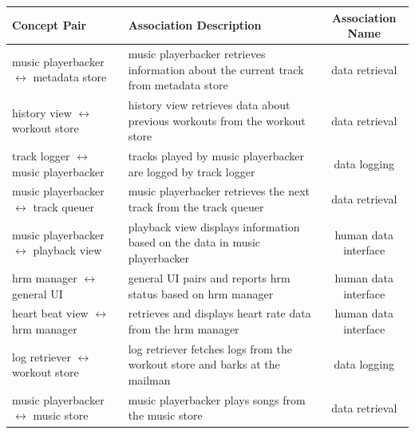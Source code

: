 \documentclass[letterpaper,english, 12pt]{scrreprt}
\begin{document}
		\begin{center}
			\renewcommand{\arraystretch}{1.5}
	        \begin{tabular}{| m{} | m{} | c |}
	            \hline
	            Concept Pair & Association Description & Association Name\\
	            \hline
	            music playerbacker $\leftrightarrow$ metadata store & music playerbacker retrieves information about the current track from metadata store & data retrieval\\
				\hline
	            history view $\leftrightarrow$ workout store & history view retrieves data about previous workouts from the workout store & data retrieval\\
				\hline
	            track logger $\leftrightarrow$ music playerbacker & tracks played by music playerbacker are logged by track logger & data logging\\
				\hline
	            music playerbacker $\leftrightarrow$ track queuer & music playerbacker retrieves the next track from the track queuer & data retrieval\\
				\hline
	            music playerbacker $\leftrightarrow$ playback view & playback view displays information based on the data in music playerbacker & human data interface\\
				\hline
	            hrm manager $\leftrightarrow$ general UI & general UI pairs and reports hrm status based on hrm manager & human data interface\\
				\hline
	            heart beat view $\leftrightarrow$ hrm manager & retrieves and displays heart rate data from the hrm manager & human data interface\\
				\hline
	            log retriever $\leftrightarrow$ workout store & log retriever fetches logs from the workout store and barks at the mailman & data logging\\
				\hline
	            music playerbacker $\leftrightarrow$ music store & music playerbacker plays songs from the music store & data retrieval\\
				\hline
	        \end{tabular}
		\end{center}
\end{document}
